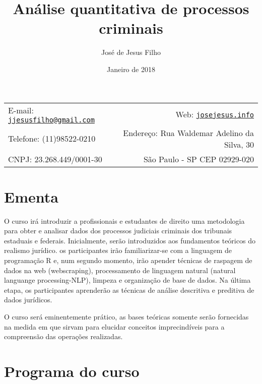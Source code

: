 \documentclass[12pt,]{article}
\title{Análise quantitativa de processos criminais}
\author{José de Jesus Filho}
\date{Janeiro de 2018}
\begin{document}
  

		\maketitle
		
	
		\thispagestyle{firststyle}



	\noindent \begin{tabular*}{\textwidth}{ @{\extracolsep{\fill}} lr @{\extracolsep{\fill}}}


E-mail: \texttt{\href{mailto:jjesusfilho@gmail.com}{\nolinkurl{jjesusfilho@gmail.com}}} & Web: \href{http://josejesus.info}{\tt josejesus.info}\\
Telefone: (11)98522-0210  &  Endereço: Rua Waldemar Adelino da Silva, 30\\
CNPJ: 23.268.449/0001-30 &  São Paulo - SP CEP 02929-020\\
	
	\hline
	\end{tabular*}
	
\vspace{2mm}
	


\section{Ementa}\label{ementa}

O curso irá introduzir a profissionais e estudantes de direito uma
metodologia para obter e analisar dados dos processos judiciais
criminais dos tribunais estaduais e federais. Inicialmente, serão
introduzidos aos fundamentos teóricos do realismo jurídico. os
participantes irão familiarizar-se com a linguagem de programação R e,
num segundo momento, irão apender técnicas de raspagem de dados na web
(webscraping), processamento de linguagem natural (natural languange
processing-NLP), limpeza e organização de base de dados. Na última
etapa, os participantes aprenderão as técnicas de análise descritiva e
preditiva de dados jurídicos.

O curso será eminentemente prático, as bases teóricas somente serão
fornecidas na medida em que sirvam para elucidar conceitos
imprecindíveis para a compreensão das operações realizadas.

\section{Programa do curso}\label{programa-do-curso}
\end{document}
